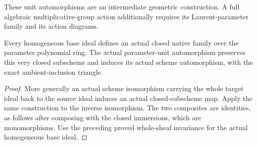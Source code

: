 These unit automorphisms are an intermediate geometric construction.  A
full algebraic multiplicative-group action additionally requires its
Laurent-parameter family and its action diagrams.

\begin{lemma}
\label{lem:native-closed-parameter-unit-iso}
\leanok
Every homogeneous base ideal defines an actual closed native family over
the parameter polynomial ring.  The actual parameter-unit automorphism
preserves this very closed subscheme and induces its actual scheme
automorphism, with the exact ambient-inclusion triangle.
\end{lemma}
\begin{proof}
More generally an actual scheme isomorphism carrying the whole target
ideal back to the source ideal induces an actual closed-subscheme map.
Apply the same construction to the inverse isomorphism.  The two
composites are identities, as follows after composing with the closed
immersions, which are monomorphisms.  Use the preceding proved
whole-sheaf invariance for the actual homogeneous base ideal.
\end{proof}
